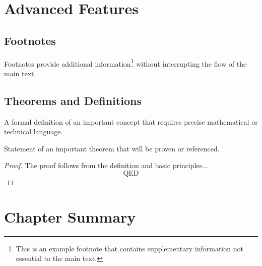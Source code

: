 \section{Advanced Features}
\label{sec:advanced}

\subsection{Footnotes}
\label{subsec:footnotes}

Footnotes provide additional information\footnote{This is an example footnote
	that contains supplementary information not essential to the main text.} without
interrupting the flow of the main text.

\subsection{Theorems and Definitions}
\label{subsec:theorems}

\begin{definition}
	A formal definition of an important concept that requires precise
	mathematical or technical language.
\end{definition}

\begin{theorem}
	\label{thm:fundamental}
	Statement of an important theorem that will be proven or referenced.
\end{theorem}

\begin{proof}
	The proof follows from the definition and basic principles...
	\[
		\text{QED}
	\]
\end{proof}

\section{Chapter Summary}
\label{sec:chapter_summary}

